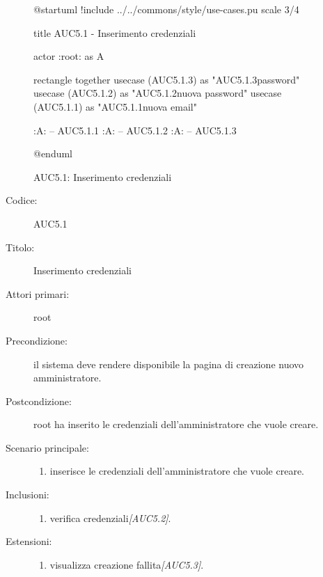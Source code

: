 \documentclass[casi-duso]{subfiles}
\begin{document}
\begin{figure}[h!] 
  \centering 
  \begin{plantuml}
  @startuml
  !include ../../commons/style/use-cases.pu
  scale 3/4

  title AUC5.1 - Inserimento credenziali

  actor :root: as A

  rectangle {
    together {
      usecase (AUC5.1.3) as "AUC5.1.3\nConferma password"
      usecase (AUC5.1.2) as "AUC5.1.2\nInserimento nuova password"
      usecase (AUC5.1.1) as "AUC5.1.1\nInserimento nuova email"
    }
  }

  :A: -- AUC5.1.1
  :A: -- AUC5.1.2
  :A: -- AUC5.1.3

  @enduml
  \end{plantuml} 
  \caption{AUC5.1: Inserimento credenziali} 
  \label{fig:auc5_1} 
\end{figure}

\begin{description}
  \item[Codice:] AUC5.1
  \item[Titolo:] Inserimento credenziali
  \item[Attori primari:] root
  \item[Precondizione:] il sistema deve rendere disponibile la pagina di creazione nuovo amministratore.
  \item[Postcondizione:] root ha inserito le credenziali dell'amministratore che vuole creare.
  \item[Scenario principale:]
  \begin{enumerate}
    \item {} inserisce le credenziali dell'amministratore che vuole creare.
  \end{enumerate}
  \item[Inclusioni:]
  \begin{enumerate}
    \item verifica credenziali\emph{[AUC5.2]}.
  \end{enumerate}
  \item[Estensioni:]
  \begin{enumerate}
    \item  visualizza creazione fallita\emph{[AUC5.3]}.
  \end{enumerate}
\end{description}
\end{document}
